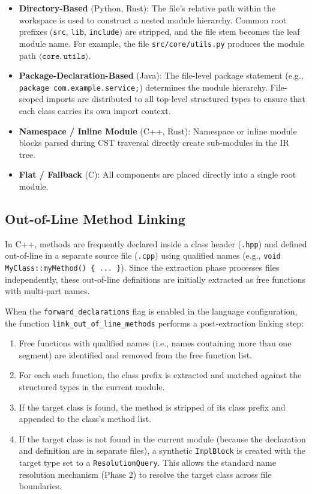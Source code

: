 \begin{itemize}
  \item \textbf{Directory-Based} (Python, Rust): The file's relative path within the workspace is used to construct a nested module hierarchy. Common root prefixes (\texttt{src}, \texttt{lib}, \texttt{include}) are stripped, and the file stem becomes the leaf module name. For example, the file \texttt{src/core/utils.py} produces the module path $\langle \texttt{core}, \texttt{utils} \rangle$.
  \item \textbf{Package-Declaration-Based} (Java): The file-level package statement (e.g., \texttt{package com.example.service;}) determines the module hierarchy. File-scoped imports are distributed to all top-level structured types to ensure that each class carries its own import context.
  \item \textbf{Namespace / Inline Module} (C++, Rust): Namespace or inline module blocks parsed during CST traversal directly create sub-modules in the IR tree.
  \item \textbf{Flat / Fallback} (C): All components are placed directly into a single root module.
\end{itemize}

\subsection{Out-of-Line Method Linking}
\label{sec:out_of_line}

In C++, methods are frequently declared inside a class header (\texttt{.hpp}) and defined out-of-line in a separate source file (\texttt{.cpp}) using qualified names (e.g., \texttt{void MyClass::myMethod() \{ ... \}}). Since the extraction phase processes files independently, these out-of-line definitions are initially extracted as free functions with multi-part names.

When the \texttt{forward\_declarations} flag is enabled in the language configuration, the function \texttt{link\_out\_of\_line\_methods} performs a post-extraction linking step:
\begin{enumerate}
  \item Free functions with qualified names (i.e., names containing more than one segment) are identified and removed from the free function list.
  \item For each such function, the class prefix is extracted and matched against the structured types in the current module.
  \item If the target class is found, the method is stripped of its class prefix and appended to the class's method list.
  \item If the target class is not found in the current module (because the declaration and definition are in separate files), a synthetic \texttt{ImplBlock} is created with the target type set to a \texttt{ResolutionQuery}. This allows the standard name resolution mechanism (Phase 2) to resolve the target class across file boundaries.
\end{enumerate}

